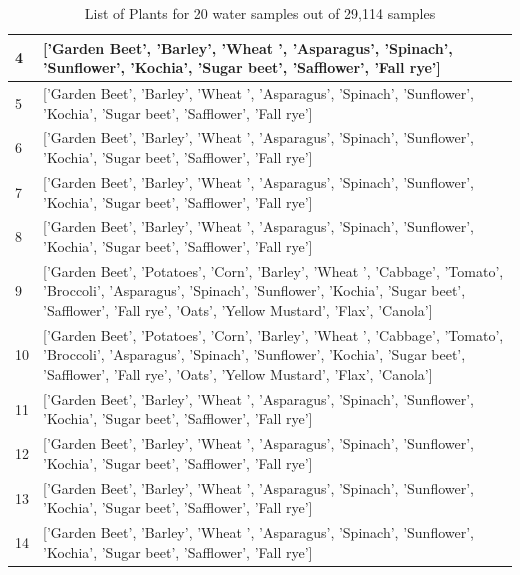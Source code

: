 \begin{table}[H]
\begin{tabular}{|m{}|m{}|}
        4 & ['Garden Beet', 'Barley', 'Wheat ', 'Asparagus', 'Spinach', 'Sunflower', 'Kochia', 'Sugar beet', 'Safflower', 'Fall rye'] \\ \hline
        5 & ['Garden Beet', 'Barley', 'Wheat ', 'Asparagus', 'Spinach', 'Sunflower', 'Kochia', 'Sugar beet', 'Safflower', 'Fall rye'] \\ \hline
        6 & ['Garden Beet', 'Barley', 'Wheat ', 'Asparagus', 'Spinach', 'Sunflower', 'Kochia', 'Sugar beet', 'Safflower', 'Fall rye'] \\ \hline
        7 & ['Garden Beet', 'Barley', 'Wheat ', 'Asparagus', 'Spinach', 'Sunflower', 'Kochia', 'Sugar beet', 'Safflower', 'Fall rye'] \\ \hline
        8 & ['Garden Beet', 'Barley', 'Wheat ', 'Asparagus', 'Spinach', 'Sunflower', 'Kochia', 'Sugar beet', 'Safflower', 'Fall rye'] \\ \hline
        9 & ['Garden Beet', 'Potatoes', 'Corn', 'Barley', 'Wheat ', 'Cabbage', 'Tomato', 'Broccoli', 'Asparagus', 'Spinach', 'Sunflower', 'Kochia', 'Sugar beet', 'Safflower', 'Fall rye', 'Oats', 'Yellow Mustard', 'Flax', 'Canola'] \\ \hline
        10 & ['Garden Beet', 'Potatoes', 'Corn', 'Barley', 'Wheat ', 'Cabbage', 'Tomato', 'Broccoli', 'Asparagus', 'Spinach', 'Sunflower', 'Kochia', 'Sugar beet', 'Safflower', 'Fall rye', 'Oats', 'Yellow Mustard', 'Flax', 'Canola'] \\ \hline
        11 & ['Garden Beet', 'Barley', 'Wheat ', 'Asparagus', 'Spinach', 'Sunflower', 'Kochia', 'Sugar beet', 'Safflower', 'Fall rye'] \\ \hline
        12 & ['Garden Beet', 'Barley', 'Wheat ', 'Asparagus', 'Spinach', 'Sunflower', 'Kochia', 'Sugar beet', 'Safflower', 'Fall rye'] \\ \hline
        13 & ['Garden Beet', 'Barley', 'Wheat ', 'Asparagus', 'Spinach', 'Sunflower', 'Kochia', 'Sugar beet', 'Safflower', 'Fall rye'] \\ \hline
        14 & ['Garden Beet', 'Barley', 'Wheat ', 'Asparagus', 'Spinach', 'Sunflower', 'Kochia', 'Sugar beet', 'Safflower', 'Fall rye'] \\ \hline
    \end{tabular}
    \caption{List of Plants for 20 water samples out of 29,114 samples}
    \label{table:waterPlantsResult}
\end{table}

